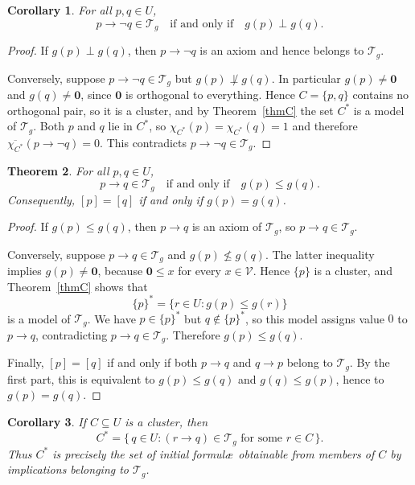 \documentclass{article}   	%
\theoremstyle{plain}
\newtheorem{theorem}{Theorem}[section]
\newtheorem{corollary}[theorem]{Corollary}
\theoremstyle{definition}
\theoremstyle{remark}
\begin{document}
\begin{corollary}
\label{negifforth}
For all $p,q\in U$,
\[
p\to\neg q \in \mathcal T_g \quad \text{if and only if} \quad g(p)\perp g(q).
\]
\end{corollary}
\begin{proof}
If $g(p)\perp g(q)$, then $p\to\neg q$ is an axiom and hence belongs to
$\mathcal T_g$.

Conversely, suppose $p\to\neg q\in\mathcal T_g$ but $g(p)\not\perp g(q)$.  In
particular $g(p)\ne\mathbf 0$ and $g(q)\ne\mathbf 0$, since $\mathbf 0$ is
orthogonal to everything.  Hence $C=\{p,q\}$ contains no orthogonal pair, so it
is a cluster, and by Theorem~\ref{thmC} the set $C^*$ is a model of
$\mathcal T_g$.  Both $p$ and $q$ lie in $C^*$, so
$\chi_{C^*}(p)=\chi_{C^*}(q)=1$ and therefore
$\overline{\chi_{C^*}}(p\to\neg q)=0$.  This contradicts
$p\to\neg q\in\mathcal T_g$.
\end{proof}
\begin{theorem}
\label{thm:equiv}
For all $p,q\in U$,
\[
p\to q \in \mathcal T_g \quad \text{if and only if} \quad g(p)\le g(q).
\]
Consequently, $[p]=[q]$ if and only if $g(p)=g(q)$.
\end{theorem}

\begin{proof}
If $g(p)\le g(q)$, then $p\to q$ is an axiom of $\mathcal T_g$, so
$p\to q\in\mathcal T_g$.

Conversely, suppose $p\to q\in\mathcal T_g$ and $g(p)\not\le g(q)$.
The latter inequality implies $g(p)\ne\mathbf 0$, because
$\mathbf 0\le x$ for every $x\in\mathcal V$.  Hence $\{p\}$ is a cluster,
and Theorem~\ref{thmC} shows that
\[
\{p\}^*=\{r\in U:g(p)\le g(r)\}
\]
is a model of $\mathcal T_g$.  We have $p\in\{p\}^*$ but
$q\notin\{p\}^*$, so this model assigns value $0$ to $p\to q$, contradicting
$p\to q\in\mathcal T_g$.  Therefore $g(p)\le g(q)$.

Finally, $[p]=[q]$ if and only if both $p\to q$ and $q\to p$ belong to
$\mathcal T_g$.  By the first part, this is equivalent to
$g(p)\le g(q)$ and $g(q)\le g(p)$, hence to $g(p)=g(q)$.
\end{proof}

\begin{corollary}
\label{cor:mp}
If $C\subseteq U$ is a cluster, then
\begin{equation}
\label{qluster}
C^*=\{\,q\in U:(r\to q)\in\mathcal T_g
          \text{ for some }r\in C\,\}.
\end{equation}
Thus $C^*$ is precisely the set of initial formul\ae\ obtainable from members
of $C$ by implications belonging to $\mathcal T_g$.
\end{corollary}
\end{document}
